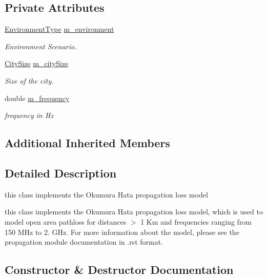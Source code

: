 \subsection*{Private Attributes}
\begin{DoxyCompactItemize}
\item 
\hyperlink{group__propagation_ga0e392ed771a28c92112047e63308a53a}{Environment\+Type} \hyperlink{classns3_1_1OkumuraHataPropagationLossModel_a2b91de7c6c22099b42d6822e47116928}{m\+\_\+environment}
\begin{DoxyCompactList}\small\item\em Environment Scenario. \end{DoxyCompactList}\item 
\hyperlink{group__propagation_ga29c9a1b1a58b6a56054ff5ea4c5a574d}{City\+Size} \hyperlink{classns3_1_1OkumuraHataPropagationLossModel_a88c918c00020cdd3fbd2ba114e9edd6e}{m\+\_\+city\+Size}
\begin{DoxyCompactList}\small\item\em Size of the city. \end{DoxyCompactList}\item 
double \hyperlink{classns3_1_1OkumuraHataPropagationLossModel_a2d67bf9147293b68bdd251c527a9b099}{m\+\_\+frequency}
\begin{DoxyCompactList}\small\item\em frequency in Hz \end{DoxyCompactList}\end{DoxyCompactItemize}
\subsection*{Additional Inherited Members}


\subsection{Detailed Description}
this class implements the Okumura Hata propagation loss model 

this class implements the Okumura Hata propagation loss model, which is used to model open area pathloss for distances $>$ 1 Km and frequencies ranging from 150 M\+Hz to 2. G\+Hz. For more information about the model, please see the propagation module documentation in .rst format. 

\subsection{Constructor \& Destructor Documentation}
